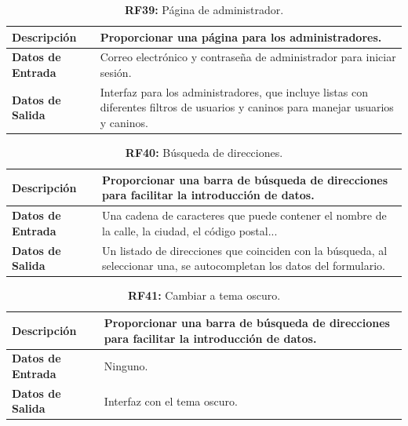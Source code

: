 \documentclass[a4paper, 12pt]{article}
\begin{document}
\begin{table}[H]
\captionsetup{justification=raggedright,singlelinecheck=false}
\caption{\textbf{RF39:} Página de administrador.}
\label{tab:RF39}
	\begin{tabular}{|m{5cm}|m{10cm}|}
	\hline
	\textbf{Descripción} & Proporcionar una página para los administradores. \\ 
	\hline
	\textbf{Datos de Entrada} & Correo electrónico y contraseña de administrador para iniciar sesión. \\ 
	\hline
	\textbf{Datos de Salida} & Interfaz para los administradores, que incluye listas con diferentes filtros de usuarios y caninos para manejar usuarios y caninos. \\ 
	\hline
\end{tabular}
\end{table}

\begin{table}[H]
\captionsetup{justification=raggedright,singlelinecheck=false}
\caption{\textbf{RF40:} Búsqueda de direcciones.}
\label{tab:RF40}
	\begin{tabular}{|m{5cm}|m{10cm}|}
	\hline
	\textbf{Descripción} & Proporcionar una barra de búsqueda de direcciones para facilitar la introducción de datos. \\ 
	\hline
	\textbf{Datos de Entrada} & Una cadena de caracteres que puede contener el nombre de la calle, la ciudad, el código postal... \\ 
	\hline
	\textbf{Datos de Salida} & Un listado de direcciones que coinciden con la búsqueda, al seleccionar una, se autocompletan los datos del formulario. \\ 
	\hline
\end{tabular}
\end{table}

\begin{table}[H]
\captionsetup{justification=raggedright,singlelinecheck=false}
\caption{\textbf{RF41:} Cambiar a tema oscuro.}
\label{tab:RF41}
	\begin{tabular}{|m{5cm}|m{10cm}|}
	\hline
	\textbf{Descripción} & Proporcionar una barra de búsqueda de direcciones para facilitar la introducción de datos. \\ 
	\hline
	\textbf{Datos de Entrada} & Ninguno.\\ 
	\hline
	\textbf{Datos de Salida} & Interfaz con el tema oscuro.  \\ 
	\hline
\end{tabular}
\end{table}
\end{document}
